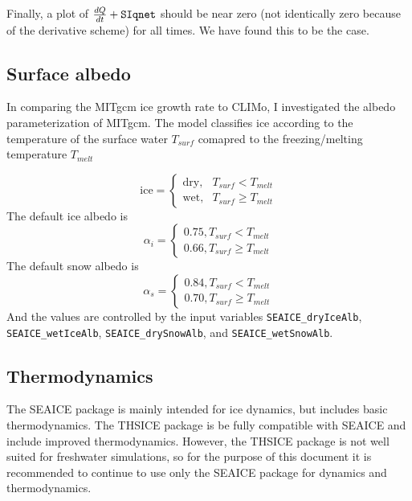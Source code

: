 \documentclass[11pt]{article}
\begin{document}
Finally, a plot of $\frac{d Q}{d t} + \verb|SIqnet|$ should be near zero (not identically zero because of the derivative scheme) for all times. We have found this to be the case.

\subsection{Surface albedo}
\label{sec:MITgcmAlbedo}
In comparing the MITgcm ice growth rate to CLIMo, I investigated the albedo parameterization of MITgcm. The model classifies ice according to the temperature of the surface water $T_{surf}$ comapred to the freezing/melting temperature $T_{melt}$

\begin{equation*}
\textrm{ice} = \begin{cases} \textrm{dry}, & T_{surf} < T_{melt} \\ \textrm{wet}, & T_{surf} \geq T_{melt} \end{cases}
\end{equation*}
The default ice albedo is
\begin{equation*}
\alpha_i = \begin{cases} 0.75, T_{surf} < T_{melt} \\ 0.66, T_{surf} \geq T_{melt} \end{cases}
\end{equation*}
The default snow albedo is
\begin{equation*}
\alpha_s = \begin{cases} 0.84, T_{surf} < T_{melt} \\ 0.70, T_{surf} \geq T_{melt} \end{cases}
\end{equation*}
And the values are controlled by the input variables \verb|SEAICE_dryIceAlb|, \verb|SEAICE_wetIceAlb|, \verb|SEAICE_drySnowAlb|, and \verb|SEAICE_wetSnowAlb|.

\subsection{Thermodynamics}
The SEAICE package is mainly intended for ice dynamics, but includes basic thermodynamics. The THSICE package is be fully compatible with SEAICE and include improved thermodynamics. However, the THSICE package is not well suited for freshwater simulations, so for the purpose of this document it is recommended to continue to use only the SEAICE package for dynamics and thermodynamics.
\end{document}
